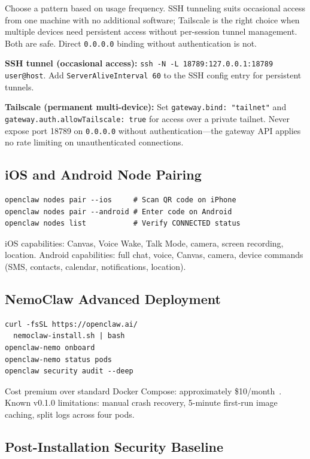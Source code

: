 \documentclass[journal]{IEEEtran}
\begin{document}
Choose a pattern based on usage frequency. SSH tunneling suits occasional
access from one machine with no additional software; Tailscale is the
right choice when multiple devices need persistent access without
per-session tunnel management. Both are safe. Direct \texttt{0.0.0.0}
binding without authentication is not.

\textbf{SSH tunnel (occasional access):}
\texttt{ssh -N -L 18789:127.0.0.1:18789 user@host}.
Add \texttt{ServerAliveInterval 60} to the SSH config entry for
persistent tunnels.

\textbf{Tailscale (permanent multi-device):} Set
\texttt{gateway.bind: "tailnet"} and
\texttt{gateway.auth.allowTailscale: true} for access over a private
tailnet. Never expose port 18789 on \texttt{0.0.0.0} without
authentication---the gateway API applies no rate limiting on
unauthenticated connections.

\subsection{iOS and Android Node Pairing}

\begin{verbatim}
openclaw nodes pair --ios     # Scan QR code on iPhone
openclaw nodes pair --android # Enter code on Android
openclaw nodes list           # Verify CONNECTED status
\end{verbatim}

iOS capabilities: Canvas, Voice Wake, Talk Mode, camera, screen recording,
location. Android capabilities: full chat, voice, Canvas, camera, device
commands (SMS, contacts, calendar, notifications, location).

\subsection{NemoClaw Advanced Deployment}

\begin{verbatim}
curl -fsSL https://openclaw.ai/
  nemoclaw-install.sh | bash
openclaw-nemo onboard
openclaw-nemo status pods
openclaw security audit --deep
\end{verbatim}

Cost premium over standard Docker Compose: approximately
\$10/month~\cite{openclaw2024docs}. Known v0.1.0 limitations: manual crash
recovery, 5-minute first-run image caching, split logs across four pods.

\subsection{Post-Installation Security Baseline}
\end{document}
